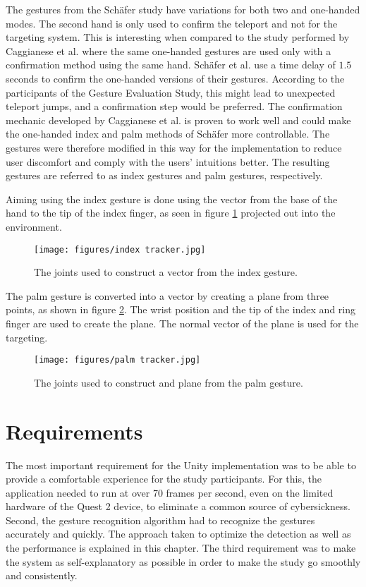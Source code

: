 The gestures from the Schäfer study have variations for both two and one-handed modes. The second hand is only used to confirm the teleport and not for the targeting system. 
This is interesting when compared to the study performed by Caggianese et al. \cite{Caggianese} where the same one-handed gestures are used only with a confirmation method using the same hand. Schäfer et al. use a time delay of $1.5$ seconds to confirm the one-handed versions of their gestures. According to the participants of the Gesture Evaluation Study, this might lead to unexpected teleport jumps, and a confirmation step would be preferred. The confirmation mechanic developed by Caggianese et al. is proven to work well and could make the one-handed index and palm methods of Schäfer more controllable. The gestures were therefore modified in this way for the implementation to reduce user discomfort and comply with the users' intuitions better. The resulting gestures are referred to as index gestures and palm gestures, respectively. 

Aiming using the index gesture is done using the vector from the base of the hand to the tip of the index finger, as seen in figure \ref{fig:indexTracker} projected out into the environment. 

\begin{figure}[!ht]
    \centering
    \texttt{[image: figures/index tracker.jpg]}
    \caption{The joints used to construct a vector from the index gesture.}
    \label{fig:indexTracker}
\end{figure}

The palm gesture is converted into a vector by creating a plane from three points, as shown in figure \ref{fig:palmTracker}. The wrist position and the tip of the index and ring finger are used to create the plane. The normal vector of the plane is used for the targeting.
\begin{figure}[!ht]
    \centering
    \texttt{[image: figures/palm tracker.jpg]}
    \caption{The joints used to construct and plane from the palm gesture.}
    \label{fig:palmTracker}
\end{figure}

\section{Requirements}
The most important requirement for the Unity implementation was to be able to provide a comfortable experience for the study participants. For this, the application needed to run at over 70 frames per second, even on the limited hardware of the Quest 2 device, to eliminate a common source of cybersickness. Second, the gesture recognition algorithm had to recognize the gestures accurately and quickly. The approach taken to optimize the detection as well as the performance is explained in this chapter. The third requirement was to make the system as self-explanatory as possible in order to make the study go smoothly and consistently. 

